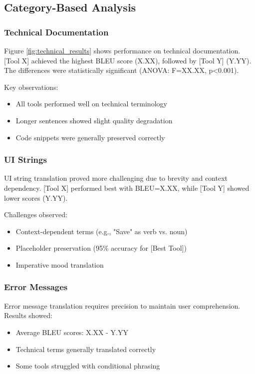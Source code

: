 \subsection{Category-Based Analysis}

\subsubsection{Technical Documentation}

Figure \ref{fig:technical_results} shows performance on technical documentation. [Tool X] achieved the highest BLEU score (X.XX), followed by [Tool Y] (Y.YY). The differences were statistically significant (ANOVA: F=XX.XX, p<0.001).

Key observations:
\begin{itemize}
    \item All tools performed well on technical terminology
    \item Longer sentences showed slight quality degradation
    \item Code snippets were generally preserved correctly
\end{itemize}

\subsubsection{UI Strings}

UI string translation proved more challenging due to brevity and context dependency. [Tool X] performed best with BLEU=X.XX, while [Tool Y] showed lower scores (Y.YY).

Challenges observed:
\begin{itemize}
    \item Context-dependent terms (e.g., "Save" as verb vs. noun)
    \item Placeholder preservation (95\% accuracy for [Best Tool])
    \item Imperative mood translation
\end{itemize}

\subsubsection{Error Messages}

Error message translation requires precision to maintain user comprehension. Results showed:
\begin{itemize}
    \item Average BLEU scores: X.XX - Y.YY
    \item Technical terms generally translated correctly
    \item Some tools struggled with conditional phrasing
\end{itemize}

